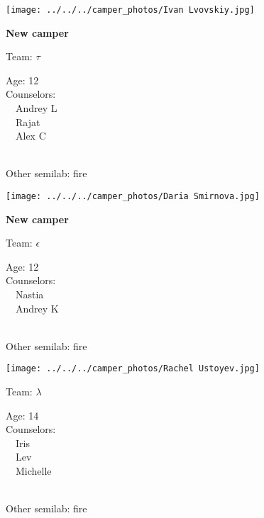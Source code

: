 \documentclass[10pt,letterpaper, landscape]{article}
\begin{document}
\horizontalshiftfornextsticker
\renewcommand{\baselinestretch}{1} \begin{sticker}
\noindent\begin{minipage}{0.5\textwidth}\texttt{[image: ../../../camper\_photos/Ivan Lvovskiy.jpg]}\end{minipage}\begin{minipage}{0.45\textwidth}
\textbf{New camper} 

Team: {\Large $\tau$}

Age:        12\\
Counselors: \\\ \ Andrey L\\\ \ Rajat\\\ \ Alex C\\
\end{minipage} \\ \vspace{0.07in}
Other semilab: fire
\end{sticker}
\verticalshiftfornextsticker
\renewcommand{\baselinestretch}{1} \begin{sticker}
\noindent\begin{minipage}{0.5\textwidth}\texttt{[image: ../../../camper\_photos/Daria Smirnova.jpg]}\end{minipage}\begin{minipage}{0.45\textwidth}
\textbf{New camper} 

Team: {\Large $\epsilon$}

Age:        12\\
Counselors: \\\ \ Nastia\\\ \ Andrey K\\
\end{minipage} \\ \vspace{0.07in}
Other semilab: fire
\end{sticker}
\horizontalshiftfornextsticker
\renewcommand{\baselinestretch}{1} \begin{sticker}
\noindent\begin{minipage}{0.5\textwidth}\texttt{[image: ../../../camper\_photos/Rachel Ustoyev.jpg]}\end{minipage}\begin{minipage}{0.45\textwidth}
Team: {\Large $\lambda$}

Age:        14\\
Counselors: \\\ \ Iris\\\ \ Lev\\\ \ Michelle\\
\end{minipage} \\ \vspace{0.07in}
Other semilab: fire
\end{sticker}
\end{document}
